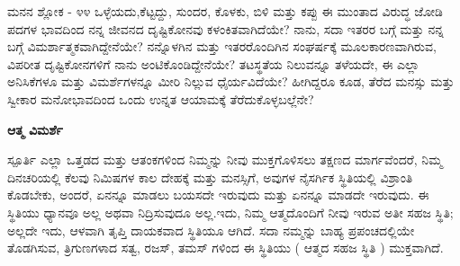 \begin{mananam}{\mananamfont \large ಮನನ ಶ್ಲೋಕ - ೪೪}
\footnotesize \mananamtext ಒಳ್ಳೆಯದು,ಕೆಟ್ಟದ್ದು, ಸುಂದರ, ಕೊಳಕು, ಬಿಳಿ ಮತ್ತು ಕಪ್ಪು ಈ ಮುಂತಾದ ವಿರುದ್ಧ ಜೋಡಿ ಪದಗಳ ಭಾವದಿಂದ ನನ್ನ ಜೀವನದ ದೃಷ್ಟಿಕೋನವು ಕಳಂಕಿತವಾಗಿದೆಯೇ? ನಾನು, ಸದಾ ಇತರರ ಬಗ್ಗೆ ಮತ್ತು ನನ್ನ ಬಗ್ಗೆ ವಿಮರ್ಶಾತ್ಮಕವಾಗಿದ್ದೇನೆಯೇ? ನನ್ನೊಳಗಿನ ಮತ್ತು ಇತರರೊಂದಿಗಿನ  ಸಂಘರ್ಷಕ್ಕೆ ಮೂಲಕಾರಣವಾಗಿರುವ, ವಿಪರೀತ ದೃಷ್ಟಿಕೋನಗಳಿಗೆ ನಾನು ಅಂಟಿಕೊಂಡಿದ್ದೇನೆಯೇ? ತಟಸ್ಥತೆಯ ನಿಲುವನ್ನೂ ತಳೆಯದೇ, ಈ ಎಲ್ಲಾ ಅನಿಸಿಕೆಗಳೂ ಮತ್ತು ವಿಮರ್ಶೆಗಳನ್ನೂ ಮೀರಿ ನಿಲ್ಲುವ ಧೈರ್ಯವಿದೆಯೇ? ಹೀಗಿದ್ದರೂ ಕೂಡ,  ತೆರೆದ ಮನಸ್ಸು ಮತ್ತು ಸ್ವೀಕಾರ ಮನೋಭಾವದಿಂದ ಒಂದು ಉನ್ನತ ಆಯಾಮಕ್ಕೆ ತೆರೆದುಕೊಳ್ಳಬಲ್ಲೆನೇ?
\end{mananam}
\WritingHand\enspace\textbf{ಆತ್ಮ ವಿಮರ್ಶೆ}
\begin{inspiration}{\mananamfont \large ಸ್ಪೂರ್ತಿ}
\footnotesize \mananamtext ಎಲ್ಲಾ ಒತ್ತಡದ ಮತ್ತು ಆತಂಕಗಳಿಂದ ನಿಮ್ಮನ್ನು ನೀವು ಮುಕ್ತಗೊಳಿಸಲು ತಕ್ಷಣದ ಮಾರ್ಗವೆಂದರೆ, ನಿಮ್ಮ ದಿನಚರಿಯಲ್ಲಿ ಕೆಲವು ನಿಮಿಷಗಳ ಕಾಲ ದೇಹಕ್ಕೆ ಮತ್ತು ಮನಸ್ಸಿಗೆ, ಅವುಗಳ ನೈಸರ್ಗಿಕ ಸ್ಥಿತಿಯಲ್ಲಿ ವಿಶ್ರಾಂತಿ ಕೊಡಬೇಕು,  ಅಂದರೆ,  ಏನನ್ನೂ ಮಾಡಲು ಬಯಸದೇ ಇರುವುದು ಮತ್ತು ಏನನ್ನೂ ಮಾಡದೇ ಇರುವುದು. ಈ ಸ್ಥಿತಿಯು ಧ್ಯಾನವೂ ಅಲ್ಲ ಅಥವಾ ನಿದ್ರಿಸುವುದೂ ಅಲ್ಲ.ಇದು, ನಿಮ್ಮ ಆತ್ಮದೊಂದಿಗೆ ನೀವು ಇರುವ ಅತೀ ಸಹಜ ಸ್ಥಿತಿ;   ಅಲ್ಲದೇ ಇದು, ಆಳವಾಗಿ ತೃಪ್ತಿ ದಾಯಕವಾದ ಸ್ಥಿತಿಯೂ ಆಗಿದೆ. ಸದಾ ನಮ್ಮನ್ನು ಬಾಹ್ಯ ಪ್ರಪಂಚದಲ್ಲಿಯೇ ತೊಡಗಿಸುವ, ತ್ರಿಗುಣಗಳಾದ ಸತ್ವ, ರಜಸ್, ತಮಸ್ ಗಳಿಂದ ಈ ಸ್ಥಿತಿಯು ( ಆತ್ಮದ ಸಹಜ ಸ್ಥಿತಿ ) ಮುಕ್ತವಾಗಿದೆ. 
\end{inspiration}
\newpage

